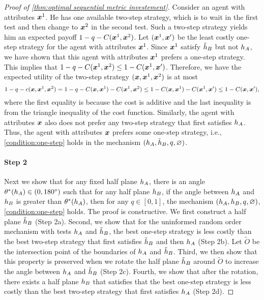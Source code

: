 \begin{proof}[Proof of \cref{thm:optimal sequential metric investement}]
    Consider an agent with attributes $\boldsymbol{x}^1$.
    He has one available two-step strategy, which is to wait in the first test and then change to $\boldsymbol{x}^2$ in the second test.
    Such a two-step strategy yields him an expected payoff $1-q - C(\boldsymbol{x}^1,\boldsymbol{x}^2)$.
    Let $(\boldsymbol{x}^1, \boldsymbol{x}')$ be the least costly one-step strategy for the agent with attributes $\boldsymbol{x}^1$. 
    Since $\boldsymbol{x}^1$ satisfy $\tilde {h}_B$ but not $h_A$, we have shown that this agent with attributes $\boldsymbol{x}^1$ prefers a one-step strategy. 
    This implies that $1- q - C(\boldsymbol{x}^1,\boldsymbol{x}^2) \leq 1 - C(\boldsymbol{x}^1, \boldsymbol{x}')$. 
    Therefore, we have the expected utility of the two-step strategy $(\boldsymbol{x}, \boldsymbol{x}^1, \boldsymbol{x}^2)$ is at most
    $$
    1-q - c(\boldsymbol{x}, \boldsymbol{x}^1, \boldsymbol{x}^2) = 1-q - C(\boldsymbol{x}, \boldsymbol{x}^1) - C(\boldsymbol{x}^1, \boldsymbol{x}^2) \leq 1- C(\boldsymbol{x}, \boldsymbol{x}^1) - C(\boldsymbol{x}^1,\boldsymbol{x}') \leq 1 - C(\boldsymbol{x},\boldsymbol{x}'),
    $$
    where the first equality is because the cost is additive and the last inequality is from the triangle inequality of the cost function. 
    Similarly, the agent with attributes $\boldsymbol{x}$ also does not prefer any two-step strategy that first satisfies $h_A$.
    Thus, the agent with attributes $\boldsymbol{x}$ prefers some one-step strategy, i.e., \cref{condition:one-step} holds in the mechanism $(h_A,\tilde{h}_B,q,\varnothing)$.

\paragraph{Step 2} 
   Next we show that for any fixed half plane $h_A$, there is an angle $\theta^*(h_A) \in (0,180^{\circ})$ such that for any half plane $h_B$, if the angle between $h_A$ and  $h_B$ is greater than $\theta^*(h_A)$, then for any $q\in [0,1]$, the mechanism $(h_A,h_B,q,\varnothing)$, \cref{condition:one-step} holds.
   The proof is constructive.
   We first construct a half plane $\tilde {h}_B$ (Step 2a).
   Second, we show that
   for the uninformed random order mechanism with tests $h_A$ and $\tilde {h}_B$, the best one-step strategy is less costly than the best two-step strategy that first satisfies $\tilde {h}_B$ and then $h_A$ (Step 2b). 
Let $\tilde O$ be the intersection point of the boundaries of $h_A$ and $\tilde {h}_B$.
Third, we then show that this property  is preserved when we rotate the half plane $\tilde{h}_B$ around $\tilde O$ to increase the angle between $h_A$ and $\tilde{h}_B$ (Step 2c). 
Fourth, we show that after the rotation, there exists a half plane $h_B$ that satisfies that the best one-step strategy is less costly than the best two-step strategy that first satisfies $h_A$ (Step 2d). 
   

\end{proof}
